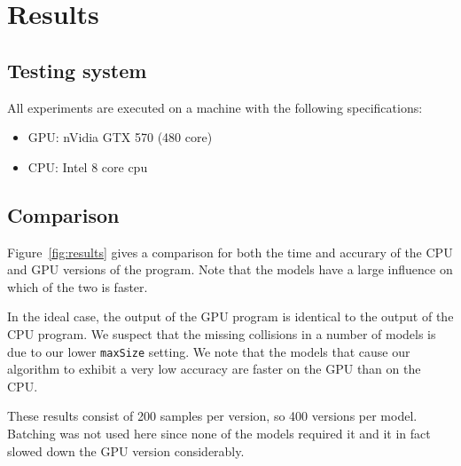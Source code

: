 \section{Results}
\subsection{Testing system} \label{sec:system}
All experiments are executed on a machine with the following specifications:
\begin{itemize}
  \item GPU: nVidia GTX 570 (480 core)
  \item CPU: Intel 8 core cpu
\end{itemize}

\subsection{Comparison}
	Figure~\ref{fig:results} gives a comparison for both the time and accurary of the CPU and GPU versions of the program.
	Note that the models have a large influence on which of the two is faster.
	
	In the ideal case, the output of the GPU program is identical to the output of the CPU program.
	We suspect that the missing collisions in a number of models is due to our lower \texttt{maxSize} setting.
	We note that the models that cause our algorithm to exhibit a very low accuracy are faster on the GPU than on the CPU.
	
	These results consist of 200 samples per version, so 400 versions per model.
	Batching was not used here since none of the models required it and it in fact slowed down the GPU version considerably.
	
